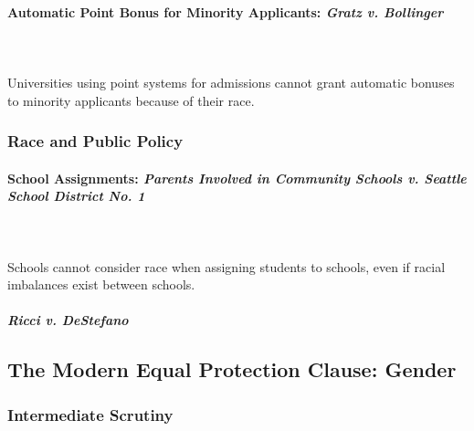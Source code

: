 \paragraph{Automatic Point Bonus for Minority Applicants: \emph{Gratz v. 
Bollinger}}
~\\\\
Universities using point systems for admissions cannot grant automatic bonuses 
to minority applicants because of their race.

 
\subsubsection{Race and Public Policy}
 
\paragraph{School Assignments: \emph{Parents Involved in Community Schools v. 
Seattle School District No. 1}}
~\\\\
Schools cannot consider race when assigning students to schools, even if 
racial imbalances exist between schools.

 
\paragraph{\emph{Ricci v. DeStefano}}

 
\subsection{The Modern Equal Protection Clause: Gender}

\subsubsection{Intermediate Scrutiny}

